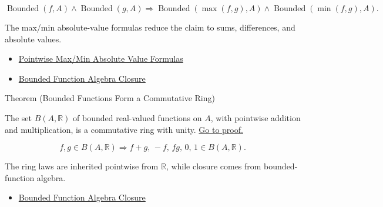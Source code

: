 \begin{remark*}
\[
  \operatorname{Bounded}(f,A)\wedge\operatorname{Bounded}(g,A)
  \Rightarrow
  \operatorname{Bounded}(\max(f,g),A)\wedge\operatorname{Bounded}(\min(f,g),A).
\]
\end{remark*}

\begin{remark*}[Interpretation]
The max/min absolute-value formulas reduce the claim to sums, differences,
and absolute values.
\end{remark*}

\begin{dependencies}
\begin{itemize}
  \item \hyperref[prop:pointwise-max-min-absolute-value-formulas]{Pointwise Max/Min Absolute Value Formulas}
  \item \hyperref[thm:bounded-function-algebra-closure]{Bounded Function Algebra Closure}
\end{itemize}
\end{dependencies}

\begin{theorembox}{Theorem (Bounded Functions Form a Commutative Ring)}
\begin{theorem}
\label{thm:bounded-functions-form-commutative-ring}
The set \(B(A,\mathbb{R})\) of bounded real-valued functions on \(A\), with
pointwise addition and multiplication, is a commutative ring with unity.
\hyperref[prf:bounded-functions-form-commutative-ring]{Go to proof.}
\end{theorem}
\end{theorembox}

\begin{remark*}
\[
  f,g\in B(A,\mathbb{R})
  \Rightarrow
  f+g,\, -f,\, fg,\, 0,\, 1 \in B(A,\mathbb{R}).
\]
\end{remark*}

\begin{remark*}[Interpretation]
The ring laws are inherited pointwise from \(\mathbb{R}\), while closure comes
from bounded-function algebra.
\end{remark*}

\begin{dependencies}
\begin{itemize}
  \item \hyperref[thm:bounded-function-algebra-closure]{Bounded Function Algebra Closure}
\end{itemize}
\end{dependencies}

